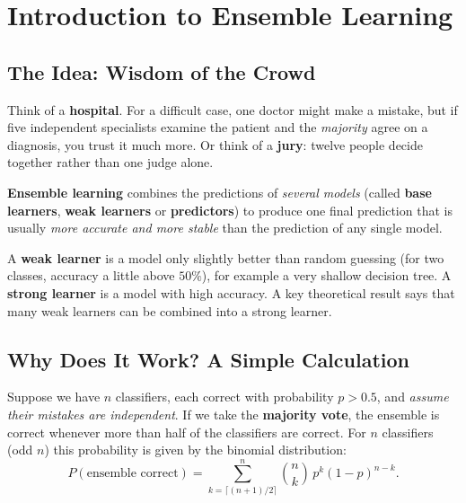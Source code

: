 \section{Introduction to Ensemble Learning}

\subsection{The Idea: Wisdom of the Crowd}

Think of a \textbf{hospital}. For a difficult case, one doctor might make a mistake, but if five independent specialists examine the patient and the \emph{majority} agree on a diagnosis, you trust it much more. Or think of a \textbf{jury}: twelve people decide together rather than one judge alone.

\begin{definition}
\textbf{Ensemble learning} combines the predictions of \emph{several models} (called \textbf{base learners}, \textbf{weak learners} or \textbf{predictors}) to produce one final prediction that is usually \emph{more accurate and more stable} than the prediction of any single model.
\end{definition}

\begin{definition}
A \textbf{weak learner} is a model only slightly better than random guessing (for two classes, accuracy a little above $50\%$), for example a very shallow decision tree. A \textbf{strong learner} is a model with high accuracy. A key theoretical result says that many weak learners can be combined into a strong learner.
\end{definition}

\subsection{Why Does It Work? A Simple Calculation}

Suppose we have $n$ classifiers, each correct with probability $p>0.5$, and \emph{assume their mistakes are independent}. If we take the \textbf{majority vote}, the ensemble is correct whenever more than half of the classifiers are correct. For $n$ classifiers (odd $n$) this probability is given by the binomial distribution:
\[
  P(\text{ensemble correct})=\sum_{k=\lceil (n+1)/2\rceil}^{n}\binom{n}{k}\,p^{k}(1-p)^{n-k}.
\]

